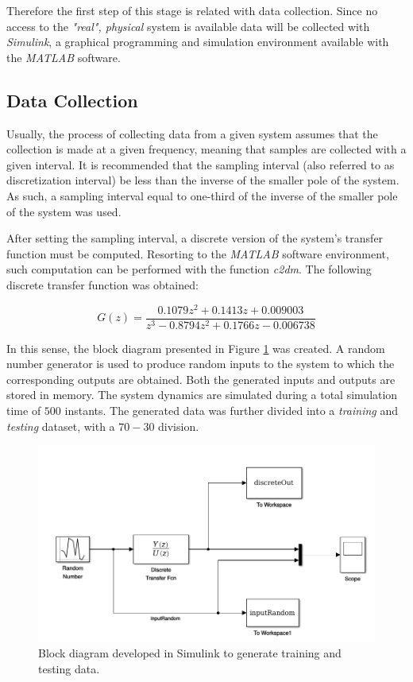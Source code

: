 \documentclass[11pt]{article}
\begin{document}
Therefore the first step of this stage is related with data collection. Since no access to the \emph{"real", physical} system is available data will be collected with \emph{Simulink}, a graphical programming and simulation environment available with the \emph{MATLAB} software.

\subsection{Data Collection}
\label{data_collection}

Usually, the process of collecting data from a given system assumes that the collection is made at a given frequency, meaning that samples are collected with a given interval. It is recommended that the sampling interval (also referred to as discretization interval) be less than the inverse of the smaller pole of the system. As such, a sampling interval equal to one-third of the inverse of the smaller pole of the system was used.

After setting the sampling interval, a discrete version of the system's transfer function must be computed. Resorting to the \emph{MATLAB} software environment, such computation can be performed with the function \emph{c2dm}. The following discrete transfer function was obtained:

$$ G(z) = \frac{0.1079z^{2} + 0.1413z + 0.009003}{z^{3} - 0.8794z^{2} + 0.1766z - 0.006738}$$

In this sense, the block diagram presented in Figure \ref{input_generator_block_diagram} was created. A random number generator is used to produce random inputs to the system to which the corresponding outputs are obtained. Both the generated inputs and outputs are stored in memory. The system dynamics are simulated during a total simulation time of $500$ instants. The generated data was further divided into a \emph{training} and \emph{testing} dataset, with a $70-30$ division.

\begin{figure}[ht]
	\centering
	\includegraphics[scale=0.4]{images/input_generator_block_diagram.png}
	\caption{Block diagram developed in Simulink to generate training and testing data.}
	\label{input_generator_block_diagram}
\end{figure}
\end{document}
